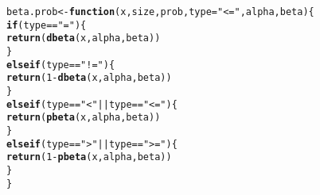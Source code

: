 \documentclass{article}\usepackage[]{graphicx}\usepackage[]{xcolor}
\makeatletter
\newcommand{\hlnum}[1]{\textcolor[rgb]{0.686,0.059,0.569}{#1}}%
\newcommand{\hlsng}[1]{\textcolor[rgb]{0.192,0.494,0.8}{#1}}%
\newcommand{\hlopt}[1]{\textcolor[rgb]{0,0,0}{#1}}%
\newcommand{\hldef}[1]{\textcolor[rgb]{0.345,0.345,0.345}{#1}}%
\newcommand{\hlkwa}[1]{\textcolor[rgb]{0.161,0.373,0.58}{\textbf{#1}}}%
\newcommand{\hlkwb}[1]{\textcolor[rgb]{0.69,0.353,0.396}{#1}}%
\newcommand{\hlkwc}[1]{\textcolor[rgb]{0.333,0.667,0.333}{#1}}%
\newcommand{\hlkwd}[1]{\textcolor[rgb]{0.737,0.353,0.396}{\textbf{#1}}}%
\newenvironment{kframe}{%
 \def\at@end@of@kframe{}%
 \ifinner\ifhmode%
  \def\at@end@of@kframe{\end{minipage}}%
  \begin{minipage}{\columnwidth}%
 \fi\fi%
 \def\FrameCommand##1{\hskip\@totalleftmargin \hskip-\fboxsep
 \colorbox{shadecolor}{##1}\hskip-\fboxsep
     \hskip-\linewidth \hskip-\@totalleftmargin \hskip\columnwidth}%
 \MakeFramed {\advance\hsize-\width
   \@totalleftmargin\z@ \linewidth\hsize
   \@setminipage}}%
 {\par\unskip\endMakeFramed%
 \at@end@of@kframe}
\newenvironment{knitrout}{}{} %
\makeatother
\begin{document}
\begin{enumerate}
\begin{knitrout}
\begin{kframe}
\begin{alltt}
\hldef{beta.prob} \hlkwb{<-} \hlkwa{function}\hldef{(}\hlkwc{x}\hldef{,} \hlkwc{size}\hldef{,} \hlkwc{prob}\hldef{,} \hlkwc{type}\hldef{=}\hlsng{"<="}\hldef{,} \hlkwc{alpha}\hldef{,} \hlkwc{beta}\hldef{)\{}
  \hlkwa{if}\hldef{(type} \hlopt{==} \hlsng{"="}\hldef{)\{}
    \hlkwd{return}\hldef{(}\hlkwd{dbeta}\hldef{(x,alpha,beta))}
  \hldef{\}}
  \hlkwa{else if}\hldef{(type} \hlopt{==} \hlsng{"!="}\hldef{)\{}
    \hlkwd{return}\hldef{(}\hlnum{1}\hlopt{-}\hlkwd{dbeta}\hldef{(x,alpha,beta))}
  \hldef{\}}
  \hlkwa{else if}\hldef{(type} \hlopt{==} \hlsng{"<"} \hlopt{||} \hldef{type} \hlopt{==} \hlsng{"<="}\hldef{)\{}
    \hlkwd{return}\hldef{(}\hlkwd{pbeta}\hldef{(x,alpha,beta))}
  \hldef{\}}
  \hlkwa{else if}\hldef{(type} \hlopt{==} \hlsng{">"} \hlopt{||} \hldef{type} \hlopt{==} \hlsng{">="}\hldef{)\{}
    \hlkwd{return}\hldef{(}\hlnum{1}\hlopt{-}\hlkwd{pbeta}\hldef{(x,alpha,beta))}
  \hldef{\}}
\hldef{\}}
\end{alltt}
\end{kframe}
\end{knitrout}
\end{enumerate}

\end{document}
